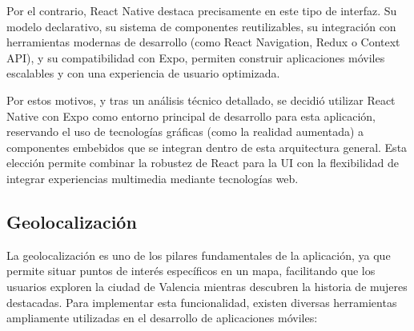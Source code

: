 Por el contrario, React Native destaca precisamente en este tipo de interfaz. Su modelo declarativo, su sistema de componentes reutilizables, su integración con herramientas modernas de desarrollo (como React Navigation, Redux o Context API), y su compatibilidad con Expo, permiten construir aplicaciones móviles escalables y con una experiencia de usuario optimizada.

Por estos motivos, y tras un análisis técnico detallado, se decidió utilizar React Native con Expo como entorno principal de desarrollo para esta aplicación, reservando el uso de tecnologías gráficas (como la realidad aumentada) a componentes embebidos que se integran dentro de esta arquitectura general. Esta elección permite combinar la robustez de React para la UI con la flexibilidad de integrar experiencias multimedia mediante tecnologías web.

\subsection{Geolocalización}

La geolocalización es uno de los pilares fundamentales de la aplicación, ya que permite situar puntos de interés específicos en un mapa, facilitando que los usuarios exploren la ciudad de Valencia mientras descubren la historia de mujeres destacadas. Para implementar esta funcionalidad, existen diversas herramientas ampliamente utilizadas en el desarrollo de aplicaciones móviles:

